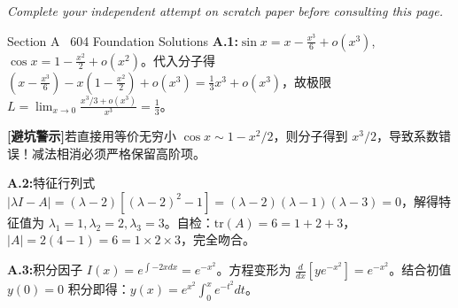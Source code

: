 \documentclass[a4paper,11pt]{article}
\newcommand{\alerttag}[1]{\textcolor{wine}{\sffamily\bfseries [#1]}}
\begin{document}
\vspace{1pt}
{\small\color{mist}\itshape\hspace{1pt} Complete your independent attempt on scratch paper before consulting this page.}

\vspace{5pt}

\begin{solution}{Section A \textperiodcentered\ 604 Foundation Solutions}
\textbf{A.1:}\enspace $\sin x = x - \frac{x^3}{6} + o(x^3)$, $\cos x = 1 - \frac{x^2}{2} + o(x^2)$。代入分子得 $\left(x - \frac{x^3}{6}\right) - x\left(1 - \frac{x^2}{2}\right) + o(x^3) = \frac{1}{3}x^3 + o(x^3)$，故极限 $L = \lim_{x\to 0}\frac{x^3/3 + o(x^3)}{x^3} = \frac{1}{3}$。
\begin{warnbox}
\alerttag{避坑警示}\enspace 若直接用等价无穷小 $\cos x \sim 1 - x^2/2$，则分子得到 $x^3/2$，导致系数错误！减法相消必须严格保留高阶项。
\end{warnbox}

\vspace{1mm}
\textbf{A.2:}\enspace 特征行列式 $|\lambda I - A| = (\lambda-2)[(\lambda-2)^2 - 1] = (\lambda-2)(\lambda-1)(\lambda-3) = 0$，解得特征值为 $\lambda_1 = 1, \lambda_2 = 2, \lambda_3 = 3$。自检：$\mathrm{tr}(A)=6=1+2+3$，$|A|=2(4-1)=6=1\times 2\times 3$，完全吻合。

\vspace{1mm}
\textbf{A.3:}\enspace 积分因子 $I(x) = e^{\int -2x dx} = e^{-x^2}$。方程变形为 $\frac{d}{dx}[y e^{-x^2}] = e^{-x^2}$。结合初值 $y(0)=0$ 积分即得：$y(x) = e^{x^2}\int_0^x e^{-t^2}dt$。
\end{solution}

\vspace{3pt}
\end{document}
